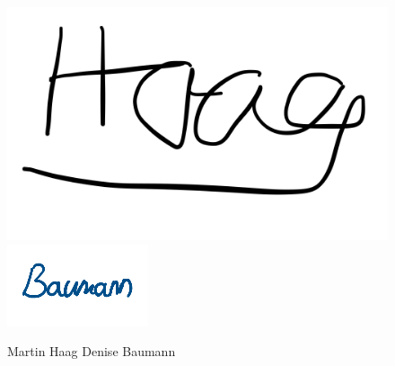 \begin{figure} [h]
\begin{minipage}[t]{0.4\textwidth}
\vspace{0pt}
\includegraphics[scale =0.3]{images/sign_haag}

\end{minipage}
\hspace{0.1\textwidth}
\begin{minipage}[t]{0.4\textwidth}
\vspace{0pt}
\includegraphics[scale =1]{images/DB}

\end{minipage}

\vspace{5pt}
Martin Haag	\hspace{12em} Denise Baumann
\end{figure}